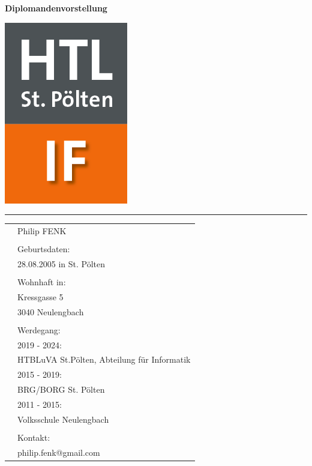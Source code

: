 \begin{flushleft}
    \Large
    \textbf{Diplomandenvorstellung\\}
    \vspace{1.5cm}
\end{flushleft}

\vspace{1cm}

\begin{flushleft}
    \hspace{3cm} \includegraphics[scale=0.3]{images/HTL_IF.png} 
    
    \vspace{-0.9cm}
    \hspace{6cm}
    \textcolor{green}{\rule{8cm}{5pt}}
\end{flushleft}


\begin{tabular}{p{3cm}l}
    & Philip FENK \\
    \\
    & Geburtsdaten: \\
    &28.08.2005 in St. Pölten \\
    \\
    &Wohnhaft in: \\
    &Kressgasse 5 \\
    &3040 Neulengbach \\
    \\
    &Werdegang:\\
    &2019 - 2024: \\
    &HTBLuVA St.Pölten, Abteilung für Informatik \\
    &2015 - 2019: \\
    &BRG/BORG St. Pölten\\
    &2011 - 2015: \\
    &Volksschule Neulengbach \\
    \\
    &Kontakt: \\
    &philip.fenk@gmail.com \\
\end{tabular}
\clearpage


